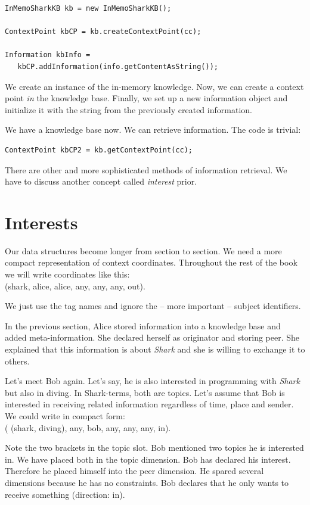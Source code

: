 \begin{verbatim}
InMemoSharkKB kb = new InMemoSharkKB();

ContextPoint kbCP = kb.createContextPoint(cc);

Information kbInfo = 
   kbCP.addInformation(info.getContentAsString());
\end{verbatim}

We create an instance of the in-memory knowledge. Now, we can create a context point {\it in} the knowledge base. Finally, we set up a new information object and initialize it with the string from the previously created information.

We have a knowledge base now. We can retrieve information. The code is trivial:

\begin{verbatim}
ContextPoint kbCP2 = kb.getContextPoint(cc);
\end{verbatim}

There are other and more sophisticated methods of information retrieval. We have to discuss another concept called {\it interest} prior.

\section{Interests}
Our data structures become longer from section to section. We need a more compact representation of context coordinates. Throughout the rest of the book we will write coordinates like this:\\
(shark, alice, alice, any, any, any, out). 

We just use the tag names and ignore the -- more important -- subject identifiers.

In the previous section, Alice stored information into a knowledge base and added meta-information. She declared herself as originator and storing peer. She explained that this information is about {\it Shark} and she is willing to exchange it to others.

Let's meet Bob again. Let's say, he is also interested in programming with {\it Shark} but also in diving. In Shark-terms, both are topics. Let's assume that Bob is interested in receiving related information regardless of time, place and sender. We could write in compact form:\\
( (shark, diving), any, bob, any, any, any, in). 

Note the two brackets in the topic slot. Bob mentioned two topics he is interested in. We have placed both in the topic dimension. Bob has declared his interest. Therefore he placed himself into the peer dimension. He spared several dimensions because he has no constraints. Bob declares that he only wants to receive something (direction: in).

